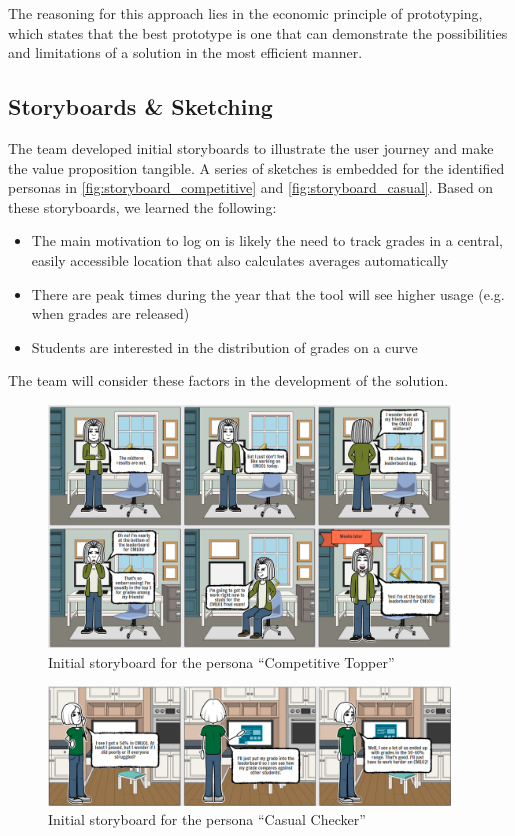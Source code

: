 The reasoning for this approach lies in the economic principle of prototyping, which states that the best prototype is one that can demonstrate the possibilities and limitations of a solution in the most efficient manner.

\subsection{Storyboards \& Sketching}
The team developed initial storyboards to illustrate the user journey and make the value proposition tangible. A series of sketches is embedded for the identified personas in \autoref{fig:storyboard_competitive} and \autoref{fig:storyboard_casual}. Based on these storyboards, we learned the following:
\begin{itemize}
    \item The main motivation to log on is likely the need to track grades in a central, easily accessible location that also calculates averages automatically
    \item There are peak times during the year that the tool will see higher usage (e.g. when grades are released)
    \item Students are interested in the distribution of grades on a curve
\end{itemize}

The team will consider these factors in the development of the solution.

\begin{figure}[H]
    \centering
    \includegraphics[width=0.95\textwidth]{competitive_topper_1.png}
    \caption{Initial storyboard for the persona ``Competitive Topper''}
    \label{fig:storyboard_competitive}
\end{figure}

\begin{figure}[H]
    \centering
    \includegraphics[width=0.95\textwidth]{casual_checker_1.png}
    \caption{Initial storyboard for the persona ``Casual Checker''}
    \label{fig:storyboard_casual}
\end{figure}

